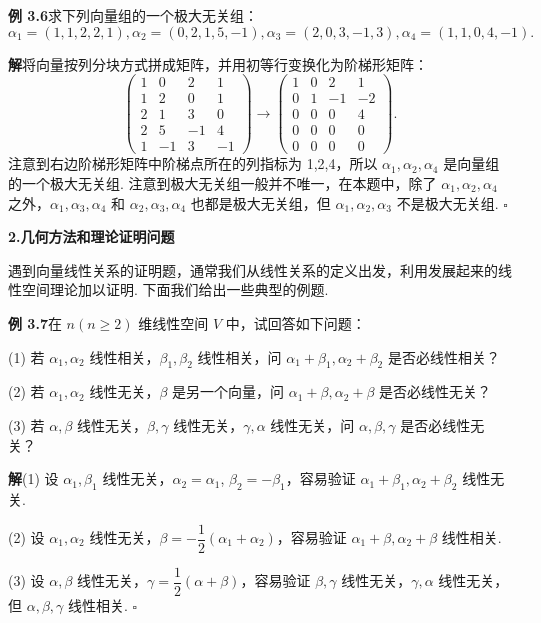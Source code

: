 \documentclass[UTF8, 12pt, fontset=fandol, oneside]{ctexart}
\begin{document}
\noindent\textbf{例 3.6}\quad 求下列向量组的一个极大无关组：
\[
\alpha_1=(1,1,2,2,1),\alpha_2=(0,2,1,5,-1),\alpha_3=(2,0,3,-1,3),\alpha_4=(1,1,0,4,-1).
\]

\noindent\textbf{解}\quad 将向量按列分块方式拼成矩阵，并用初等行变换化为阶梯形矩阵：
\[
\begin{pmatrix}
1 & 0 & 2 & 1\\
1 & 2 & 0 & 1\\
2 & 1 & 3 & 0\\
2 & 5 & -1 & 4\\
1 & -1 & 3 & -1
\end{pmatrix}
\to
\begin{pmatrix}
1 & 0 & 2 & 1\\
0 & 1 & -1 & -2\\
0 & 0 & 0 & 4\\
0 & 0 & 0 & 0\\
0 & 0 & 0 & 0
\end{pmatrix}.
\]
注意到右边阶梯形矩阵中阶梯点所在的列指标为 1,2,4，所以 $\alpha_1,\alpha_2,\alpha_4$ 是向量组的一个极大无关组. 注意到极大无关组一般并不唯一，在本题中，除了 $\alpha_1,\alpha_2,\alpha_4$ 之外，$\alpha_1,\alpha_3,\alpha_4$ 和 $\alpha_2,\alpha_3,\alpha_4$ 也都是极大无关组，但 $\alpha_1,\alpha_2,\alpha_3$ 不是极大无关组. $\square$

\noindent\textbf{2.\quad 几何方法和理论证明问题}

遇到向量线性关系的证明题，通常我们从线性关系的定义出发，利用发展起来的线性空间理论加以证明. 下面我们给出一些典型的例题.

\noindent\textbf{例 3.7}\quad 在 $n(n\ge 2)$ 维线性空间 $V$ 中，试回答如下问题：

(1) 若 $\alpha_1,\alpha_2$ 线性相关，$\beta_1,\beta_2$ 线性相关，问 $\alpha_1+\beta_1,\alpha_2+\beta_2$ 是否必线性相关？

(2) 若 $\alpha_1,\alpha_2$ 线性无关，$\beta$ 是另一个向量，问 $\alpha_1+\beta,\alpha_2+\beta$ 是否必线性无关？

(3) 若 $\alpha,\beta$ 线性无关，$\beta,\gamma$ 线性无关，$\gamma,\alpha$ 线性无关，问 $\alpha,\beta,\gamma$ 是否必线性无关？

\noindent\textbf{解}\quad (1) 设 $\alpha_1,\beta_1$ 线性无关，$\alpha_2=\alpha_1$, $\beta_2=-\beta_1$，容易验证 $\alpha_1+\beta_1,\alpha_2+\beta_2$ 线性无关.

(2) 设 $\alpha_1,\alpha_2$ 线性无关，$\beta=-\dfrac{1}{2}(\alpha_1+\alpha_2)$，容易验证 $\alpha_1+\beta,\alpha_2+\beta$ 线性相关.

(3) 设 $\alpha,\beta$ 线性无关，$\gamma=\dfrac{1}{2}(\alpha+\beta)$，容易验证 $\beta,\gamma$ 线性无关，$\gamma,\alpha$ 线性无关，但 $\alpha,\beta,\gamma$ 线性相关. $\square$
\end{document}

